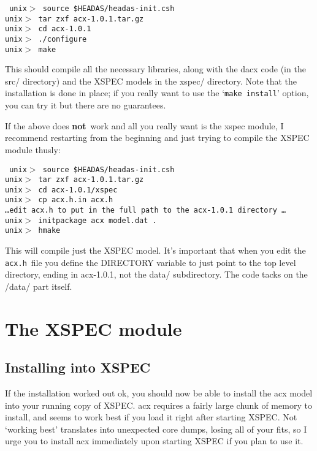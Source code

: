 \documentclass[11pt]{article}
\newcommand{\version}{1.0.1}
\begin{document}
{\tt
\noindent unix$>$ source \$HEADAS/headas-init.csh \\
\noindent unix$>$ tar zxf acx-\version.tar.gz \\
\noindent unix$>$ cd acx-\version \\
\noindent unix$>$ ./configure \\
\noindent unix$>$ make \\
}

This should compile all the necessary libraries, along with the dacx
code (in the src/ directory) and the XSPEC models in the xspec/
directory.  Note that the installation is done in place; if you really
want to use the `{\tt make install}' option, you can try it but there
are no guarantees.

If the above does {\bf not}\ work and all you really want is the xspec
module, I recommend restarting from the beginning and just trying to
compile the XSPEC module thusly:

{\tt
\noindent unix$>$ source \$HEADAS/headas-init.csh \\
\noindent unix$>$ tar zxf acx-\version.tar.gz\\
\noindent unix$>$ cd acx-\version/xspec\\
\noindent unix$>$ cp acx.h.in acx.h\\
\noindent \dots edit acx.h to put in the full path to the acx-\version
directory \dots\\
\noindent unix$>$ initpackage acx model.dat .\\
\noindent unix$>$ hmake\\
}

This will compile just the XSPEC model.  It's important that when you
edit the {\tt acx.h}\ file you define the DIRECTORY variable to just
point to the top level directory, ending in acx-\version, not the
data/ subdirectory.  The code tacks on the /data/ part itself.

\section*{The XSPEC module}

\subsection*{Installing into XSPEC}

If the installation worked out ok, you should now be able to install
the acx model into your running copy of XSPEC.  acx requires a fairly
large chunk of memory to install, and seems to work best if you load
it right after starting XSPEC.  Not `working best' translates into
unexpected core dumps, losing all of your fits, so I urge you to
install acx immediately upon starting XSPEC if you plan to use it.
\end{document}
